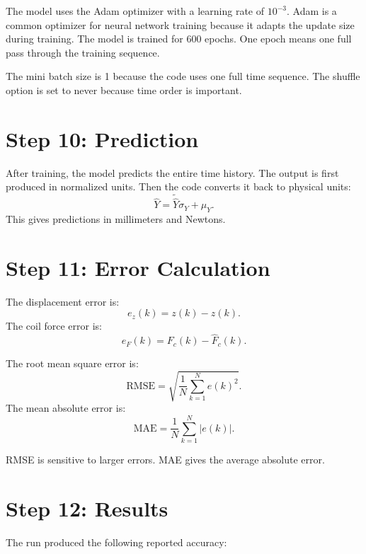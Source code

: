 \documentclass[11pt]{article}
\begin{document}
The model uses the Adam optimizer with a learning rate of \(10^{-3}\). Adam is a common optimizer for neural network training because it adapts the update size during training. The model is trained for 600 epochs. One epoch means one full pass through the training sequence.

The mini batch size is 1 because the code uses one full time sequence. The shuffle option is set to never because time order is important.

\section{Step 10: Prediction}

After training, the model predicts the entire time history. The output is first produced in normalized units. Then the code converts it back to physical units:
\begin{equation}
    \hat{Y} = \tilde{\hat{Y}}\sigma_Y + \mu_Y.
\end{equation}
This gives predictions in millimeters and Newtons.

\section{Step 11: Error Calculation}

The displacement error is:
\begin{equation}
    e_z(k) = z(k) - \hat{z}(k).
\end{equation}
The coil force error is:
\begin{equation}
    e_F(k) = F_c(k) - \hat{F}_c(k).
\end{equation}

The root mean square error is:
\begin{equation}
    \mathrm{RMSE} = \sqrt{\frac{1}{N}\sum_{k=1}^{N}e(k)^2}.
\end{equation}
The mean absolute error is:
\begin{equation}
    \mathrm{MAE} = \frac{1}{N}\sum_{k=1}^{N}|e(k)|.
\end{equation}

RMSE is sensitive to larger errors. MAE gives the average absolute error.

\section{Step 12: Results}

The run produced the following reported accuracy:
\end{document}
